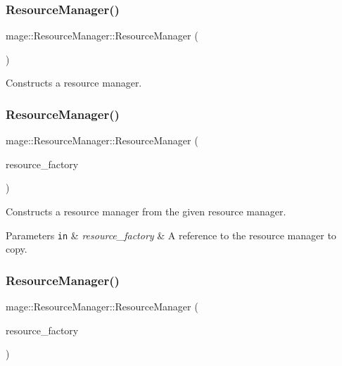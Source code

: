 \subsubsection{\texorpdfstring{Resource\+Manager()}{ResourceManager()}\hspace{0.1cm}{\footnotesize\ttfamily [1/3]}}
{\footnotesize\ttfamily mage\+::\+Resource\+Manager\+::\+Resource\+Manager (\begin{DoxyParamCaption}{ }\end{DoxyParamCaption})}

Constructs a resource manager. \hypertarget{classmage_1_1_resource_manager_a7d61b10f18bb0ea34bc2a1e9920eeb3d}{}\label{classmage_1_1_resource_manager_a7d61b10f18bb0ea34bc2a1e9920eeb3d} 
\subsubsection{\texorpdfstring{Resource\+Manager()}{ResourceManager()}\hspace{0.1cm}{\footnotesize\ttfamily [2/3]}}
{\footnotesize\ttfamily mage\+::\+Resource\+Manager\+::\+Resource\+Manager (\begin{DoxyParamCaption}\item[{const \hyperlink{classmage_1_1_resource_manager}{Resource\+Manager} \&}]{resource\+\_\+factory }\end{DoxyParamCaption})\hspace{0.3cm}{\ttfamily [delete]}}

Constructs a resource manager from the given resource manager.


\begin{DoxyParams}[1]{Parameters}
\mbox{\tt in}  & {\em resource\+\_\+factory} & A reference to the resource manager to copy. \\
\hline
\end{DoxyParams}
\hypertarget{classmage_1_1_resource_manager_a7aa3b08f3edd385b48694ae4b301ebba}{}\label{classmage_1_1_resource_manager_a7aa3b08f3edd385b48694ae4b301ebba} 
\subsubsection{\texorpdfstring{Resource\+Manager()}{ResourceManager()}\hspace{0.1cm}{\footnotesize\ttfamily [3/3]}}
{\footnotesize\ttfamily mage\+::\+Resource\+Manager\+::\+Resource\+Manager (\begin{DoxyParamCaption}\item[{\hyperlink{classmage_1_1_resource_manager}{Resource\+Manager} \&\&}]{resource\+\_\+factory }\end{DoxyParamCaption})\hspace{0.3cm}{\ttfamily [default]}}

